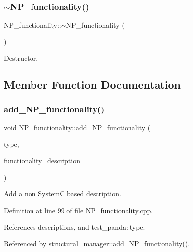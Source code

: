 \subsubsection{\texorpdfstring{$\sim$\+N\+P\+\_\+functionality()}{~NP\_functionality()}}
{\footnotesize\ttfamily N\+P\+\_\+functionality\+::$\sim$\+N\+P\+\_\+functionality (\begin{DoxyParamCaption}{ }\end{DoxyParamCaption})\hspace{0.3cm}{\ttfamily [default]}}



Destructor. 



\subsection{Member Function Documentation}
\mbox{\label{classNP__functionality_a9196a24d011ae0a9e6e5bc4fed912ef7}} 
\subsubsection{\texorpdfstring{add\+\_\+\+N\+P\+\_\+functionality()}{add\_NP\_functionality()}}
{\footnotesize\ttfamily void N\+P\+\_\+functionality\+::add\+\_\+\+N\+P\+\_\+functionality (\begin{DoxyParamCaption}\item[{\hyperlink{classNP__functionality_a318d6f254060bfdf145ebeb41efe772e}{N\+P\+\_\+functionaly\+\_\+type}}]{type,  }\item[{const std\+::string \&}]{functionality\+\_\+description }\end{DoxyParamCaption})}



Add a non SystemC based description. 



Definition at line 99 of file N\+P\+\_\+functionality.\+cpp.



References descriptions, and test\+\_\+panda\+::type.



Referenced by structural\+\_\+manager\+::add\+\_\+\+N\+P\+\_\+functionality().

